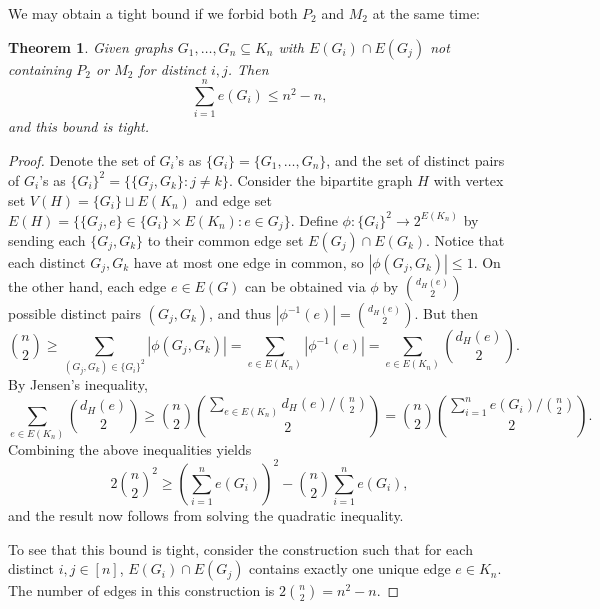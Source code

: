 \documentclass[12pt]{report}
\newtheorem{theorem}{Theorem}[chapter]
\begin{document}
We may obtain a tight bound if we forbid both $P_2$ and $M_2$ at the same time:

\begin{theorem}
  Given graphs $G_1, \ldots, G_n \subseteq K_n$ with $E(G_i) \cap E(G_j)$ not containing $P_2$ or
  $M_2$ for distinct $i, j$. Then
  \[
    \sum_{i = 1}^n e(G_i) \leq n^2 - n,
  \]
  and this bound is tight.
\end{theorem}

\begin{proof}
  Denote the set of $G_i$'s as $\{G_i\} = \{G_1, \ldots, G_n\}$, and the set of distinct pairs of
  $G_i$'s as $\{G_i\}^2 = \{\{G_j, G_k\} : j \neq k\}$. Consider the bipartite graph $H$ with
  vertex set $V(H) = \{G_i\} \sqcup E(K_n)$ and edge set $E(H) = \{\{G_j, e\} \in \{G_i\} \times
  E(K_n) : e \in G_j\}$. Define $\phi: \{G_i\}^2 \to 2^{E(K_n)}$ by sending each $\{G_j, G_k\}$ to
  their common edge set $E(G_j) \cap E(G_k)$. Notice that each distinct $G_j, G_k$ have at most
  one edge in common, so $|\phi(G_j, G_k)| \leq 1$. On the other hand, each edge $e \in E(G)$ can
  be obtained via $\phi$ by $\binom{d_H(e)}{2}$ possible distinct pairs $(G_j, G_k)$, and thus
  $|\phi^{-1}(e)| = \binom{d_H(e)}{2}$. But then
  \[
    \binom{n}{2} \geq \sum_{(G_j, G_k) \in \{G_i\}^2} |\phi(G_j, G_k)| = \sum_{e \in E(K_n)} |\phi^{-1}(e)| = \sum_{e \in E(K_n)} \binom{d_H(e)}{2}.
  \]
  By Jensen's inequality,
  \[
    \sum_{e \in E(K_n)} \binom{d_H(e)}{2} \geq \binom{n}{2}\binom{\sum_{e \in E(K_n)} d_H(e)/\binom{n}{2}}{2} = \binom{n}{2}\binom{\sum_{i = 1}^n e(G_i)/\binom{n}{2}}{2}.
  \]
  Combining the above inequalities yields
  \[
    2\binom{n}{2}^2 \geq \left(\sum_{i = 1}^n e(G_i)\right)^2 - \binom{n}{2}\sum_{i = 1}^n e(G_i),
  \]
  and the result now follows from solving the quadratic inequality.

  To see that this bound is tight, consider the construction such that for each distinct $i, j \in
  [n]$, $E(G_i) \cap E(G_j)$ contains exactly one unique edge $e \in K_n$. The number of edges in
  this construction is $2\binom{n}{2} = n^2 - n$.
\end{proof}
\end{document}
